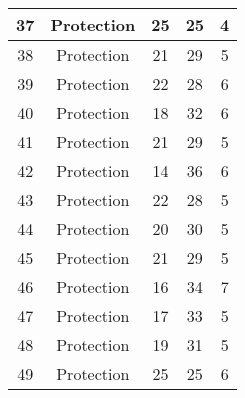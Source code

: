 \documentclass[results.tex]{subfiles}
\begin{document}
\begin{center}
\begin{tabular}{| c || c | c | c | c |}
            \hline
            37                      & Protection                   & 25                     & 25                      & 4                    \\
            \hline
            38                      & Protection                   & 21                     & 29                      & 5                    \\
            \hline
            39                      & Protection                   & 22                     & 28                      & 6                    \\
            \hline
            40                      & Protection                   & 18                     & 32                      & 6                    \\
            \hline
            41                      & Protection                   & 21                     & 29                      & 5                    \\
            \hline
            42                      & Protection                   & 14                     & 36                      & 6                    \\
            \hline
            43                      & Protection                   & 22                     & 28                      & 5                    \\
            \hline
            44                      & Protection                   & 20                     & 30                      & 5                    \\
            \hline
            45                      & Protection                   & 21                     & 29                      & 5                    \\
            \hline
            46                      & Protection                   & 16                     & 34                      & 7                    \\
            \hline
            47                      & Protection                   & 17                     & 33                      & 5                    \\
            \hline
            48                      & Protection                   & 19                     & 31                      & 5                    \\
            \hline
            49                      & Protection                   & 25                     & 25                      & 6                    \\
            \hline
        \end{tabular}
    \end{center}
\end{document}
